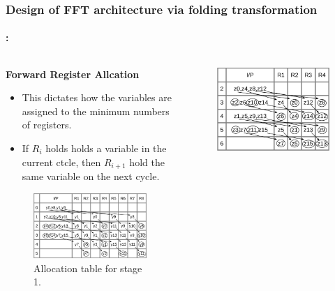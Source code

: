 \begin{frame}
	\frametitle{\textbf{Design of FFT architecture via folding transformation}}
	\framesubtitle{\secname : \subsecname}
	\vspace{-0.5cm}
	 \begin{columns}[t,onlytextwidth]
	      \begin{column}{0.5\linewidth}
			\begin{block}{\centering \textbf{Forward Register Allcation}}
				\begin{itemize}\justifying\footnotesize
		        	\item This dictates how the variables are assigned to the minimum numbers of registers. \vfill
		        	\item If $R_i$ holds holds a variable in the current ctcle, then $R_{i+1}$ hold the same variable on the next cycle.
		       	\end{itemize}
			\end{block}
			\vspace{-0.3cm}
			\begin{figure}[h!] \centering
	    		\includegraphics[height=0.30\paperheight]{./image/tab-life-a.png}
	    		\caption{\footnotesize Allocation table for stage 1.}
	    	\end{figure}
   		  \end{column}
   		  \begin{column}{0.45\linewidth}
   			\begin{figure}[h!] \centering
	    		\includegraphics[height=0.25\paperheight]{./image/tab-life-b.png}

\end{figure}
\end{column}
\end{columns}
\end{frame}
